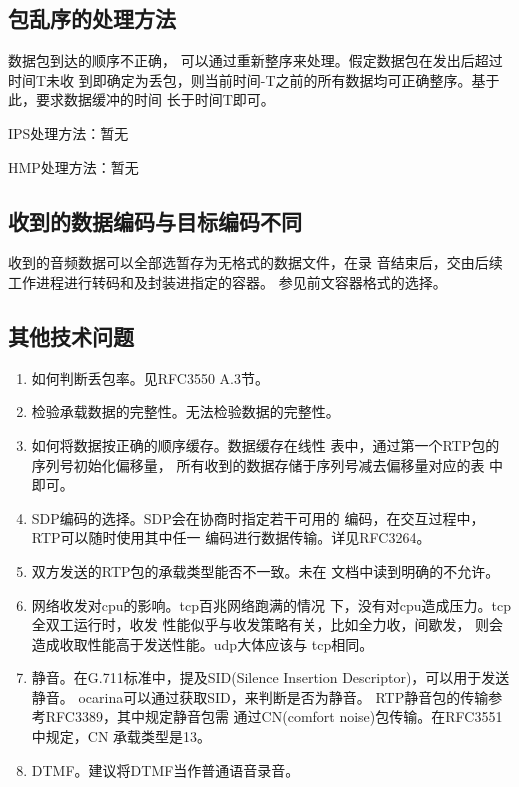 \documentclass[11pt]{article}
\begin{document}
\subsection{包乱序的处理方法}
   数据包到达的顺序不正确， 可以通过重新整序来处理。假定数据包在发出后超过时间T未收
到即确定为丢包，则当前时间-T之前的所有数据均可正确整序。基于此，要求数据缓冲的时间
长于时间T即可。

    IPS处理方法：暂无

    HMP处理方法：暂无
\subsection{收到的数据编码与目标编码不同}
    收到的音频数据可以全部选暂存为无格式的数据文件，在录
音结束后，交由后续工作进程进行转码和及封装进指定的容器。
参见前文容器格式的选择。
\subsection{其他技术问题}
    \begin{enumerate}
        \item 如何判断丢包率。见RFC3550 A.3节。
        \item 检验承载数据的完整性。无法检验数据的完整性。
        \item 如何将数据按正确的顺序缓存。数据缓存在线性
            表中，通过第一个RTP包的序列号初始化偏移量，
            所有收到的数据存储于序列号减去偏移量对应的表
            中即可。
        \item SDP编码的选择。SDP会在协商时指定若干可用的
            编码，在交互过程中，RTP可以随时使用其中任一
            编码进行数据传输。详见RFC3264。
        \item 双方发送的RTP包的承载类型能否不一致。未在
            文档中读到明确的不允许。
        \item 网络收发对cpu的影响。tcp百兆网络跑满的情况
            下，没有对cpu造成压力。tcp全双工运行时，收发
            性能似乎与收发策略有关，比如全力收，间歇发，
            则会造成收取性能高于发送性能。udp大体应该与
            tcp相同。
        \item 静音。在G.711标准中，提及SID(Silence 
            Insertion Descriptor)，可以用于发送静音。
            ocarina可以通过获取SID，来判断是否为静音。
            RTP静音包的传输参考RFC3389，其中规定静音包需
            通过CN(comfort noise)包传输。在RFC3551中规定，CN
            承载类型是13。
        \item DTMF。建议将DTMF当作普通语音录音。
    \end{enumerate}
\end{document}
